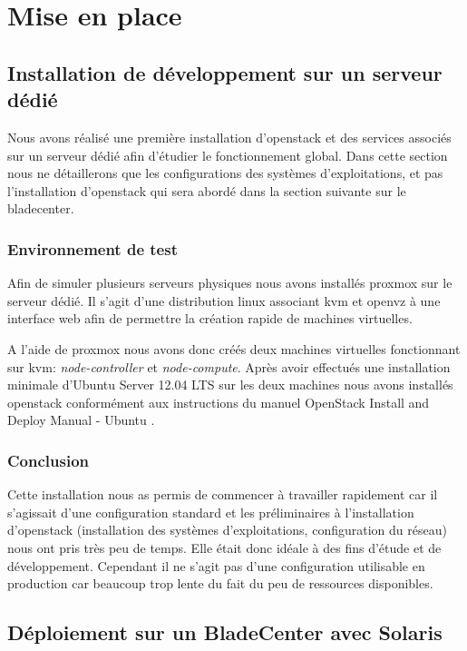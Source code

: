 \documentclass[a4paper,oneside]{report}
\begin{document}
\chapter{Mise en place} \label{cha:miseenplace}
\section{Installation de développement sur un serveur dédié}
Nous avons réalisé une première installation d'\gls{openstack} et des services associés sur un serveur dédié afin d'étudier le fonctionnement global.
Dans cette section nous ne détaillerons que les configurations des systèmes d'exploitations, et pas l'installation d'\gls{openstack} qui sera abordé dans la section suivante sur le \gls{bladecenter}.

\subsection{Environnement de test}
Afin de simuler plusieurs serveurs physiques nous avons installés \gls{proxmox} sur le serveur dédié. Il s'agit d'une distribution \gls{linux} associant \gls{kvm} et \gls{openvz} à une interface web afin de permettre la création rapide de machines virtuelles.

A l'aide de \gls{proxmox} nous avons donc créés deux machines virtuelles fonctionnant sur \gls{kvm}: \emph{node-controller} et \emph{node-compute}. Après avoir effectués une installation minimale d'Ubuntu Server 12.04 LTS sur les deux machines nous avons installés \gls{openstack} conformément aux instructions du manuel \og OpenStack Install and Deploy Manual - Ubuntu \fg \cite{OSFolsomInstallUbuntu1210}.

\subsection{Conclusion}
Cette installation nous as permis de commencer à travailler rapidement car il s'agissait d'une configuration standard et les préliminaires à l'installation d'\gls{openstack} (installation des systèmes d'exploitations, configuration du réseau) nous ont pris très peu de temps.
Elle était donc idéale à des fins d'étude et de développement.\newline
Cependant il ne s'agit pas d'une configuration utilisable en production car beaucoup trop lente du fait du peu de ressources disponibles.

\section{Déploiement sur un BladeCenter avec Solaris} \label{sec:depsolaris}
\end{document}
